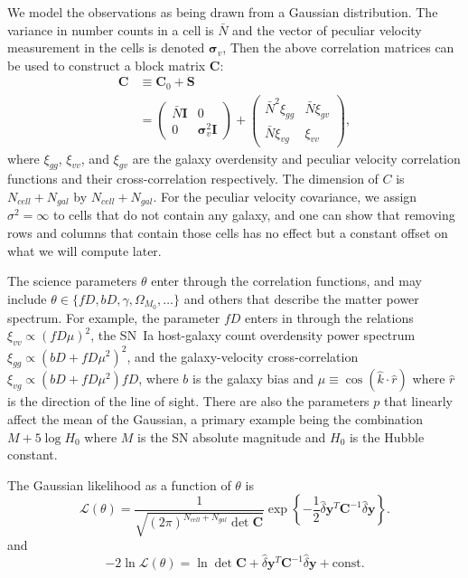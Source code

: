\documentclass{article}
\begin{document}
We model the observations as being drawn from a Gaussian distribution.
The variance in number counts in a cell is $\bar{N}$ and the vector of peculiar velocity measurement in the cells is denoted $\bm{\sigma}_v$,
  Then the above correlation matrices can be used to construct a block matrix $\textbf{C}$:
\begin{align}
\textbf{C} &\equiv \textbf{C}_0 + \textbf{S}\\
&=
\left(
\begin{array}{cc}
\bar{N}\textbf{I} & 0 \nonumber \\
0 & \bm{\sigma}_v^2\textbf{I}
\end{array}
\right)
+
\begin{pmatrix}
\bar{N}^2\xi_{gg} & \bar{N}\xi_{g v} \\
\bar{N}\xi_{v g} & \xi_{vv}
\end{pmatrix},
\end{align}
where $\xi_{gg}$, $\xi_{vv}$, and $\xi_{g v}$ are the galaxy overdensity and peculiar velocity correlation functions and their cross-correlation
respectively.  
The dimension of $C$ is $N_{cell}+N_{gal}$ by $N_{cell}+N_{gal}$. For the peculiar velocity covariance, we assign $\sigma^2=\infty$ to cells that do not contain any galaxy, and one can show that removing rows and columns that contain those cells has no effect but a constant offset on what we will compute later.


The science parameters $\theta$ enter through the correlation functions, and may include $\theta \in \{fD, bD, \gamma, \Omega_{M_0},\ldots\}$ and others
that describe the matter power spectrum.
For example, the parameter $fD$ enters in through the relations $\xi_{vv}\propto (fD\mu)^2$, the SN~Ia host-galaxy count overdensity
power spectrum $\xi_{g g }\propto (bD + fD\mu^2)^2$, and the galaxy-velocity cross-correlation $\xi_{vg}
\propto  (bD + fD\mu^2)fD$, where $b$ is the galaxy bias and $\mu\equiv \cos{(\hat{k} \cdot \hat{r})}$ where $\hat{r}$ is the direction of
the line of sight.   There are also the parameters $p$ that linearly affect the mean of the Gaussian, a primary example being the combination
$M+5\log{H_0}$ where $M$ is the SN absolute magnitude and $H_0$ is the Hubble constant.


The Gaussian likelihood as a function of $\theta$ is
\[
\mathcal{L}(\theta) = \frac{1}{\sqrt{\left(2\pi\right)^{N_{cell}+N_{gal}} \det \textbf{C}}}\exp\left\{-\frac{1}{2}\hat{\delta} \textbf{y}^T\textbf{C}^{-1}\hat{\delta} \textbf{y}\right\}.
\]
and
\begin{equation}
-2\ln\mathcal{L}(\theta) = \ln\det\textbf{C} + \hat{\delta} \textbf{y}^T\textbf{C}^{-1}\hat{\delta} \textbf{y} + \text{const}.
\label{log:eqn}
\end{equation}
\end{document}
